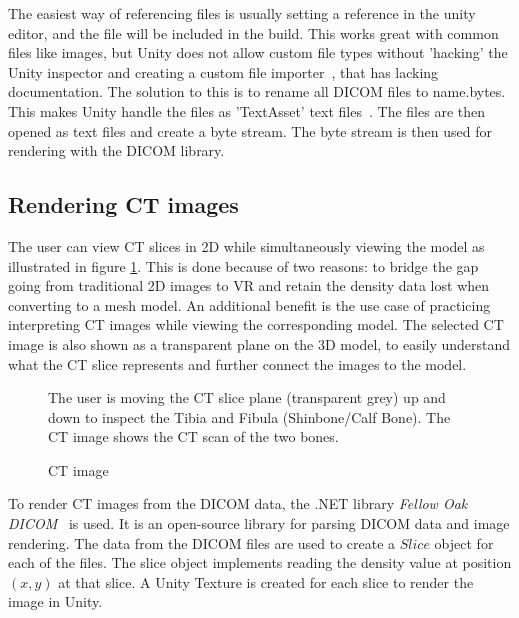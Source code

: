\documentclass[a4paper]{report}
\begin{document}
The easiest way of referencing files is usually setting a reference in the unity editor, and the file will be included in the build. This works great with common files like images, but Unity does not allow custom file types without 'hacking' the Unity inspector and creating a custom file importer~\cite{scriptedimporters_unity_nodate}, that has lacking documentation. The solution to this is to rename all DICOM files to {name}.bytes. This makes Unity handle the files as 'TextAsset' text files~\cite{textassets_unity_nodate}. The files are then opened as text files and create a byte stream. The byte stream is then used for rendering with the DICOM library.

\subsection{Rendering CT images}

The user can view CT slices in 2D while simultaneously viewing the model as illustrated in figure \ref{ctscan}. This is done because of two reasons: to bridge the gap going from traditional 2D images to VR and retain the density data lost when converting to a mesh model.
An additional benefit is the use case of practicing interpreting CT images while viewing the corresponding model. The selected CT image is also shown as a transparent plane on the 3D model, to easily understand what the CT slice represents and further connect the images to the model.

\begin{figure}[h!]
    \centering
	\hfill
	\caption{CT image}\label{ctscan}
  \small
 The user is moving the CT slice plane (transparent grey) up and down to inspect the Tibia and Fibula (Shinbone/Calf Bone). The CT image shows the CT scan of the two bones.
~~\cite{mishra_virtual_2019}
\end{figure}

To render CT images from the DICOM data, the .NET library \emph{Fellow Oak DICOM}~\cite{noauthor_fellow_2022} is used. It is an open-source library for parsing DICOM data and image rendering.
The data from the DICOM files are used to create a $Slice$ object for each of the files. The slice object implements reading the density value at position $(x, y)$ at that slice. A Unity Texture is created for each slice to render the image in Unity.
\end{document}
